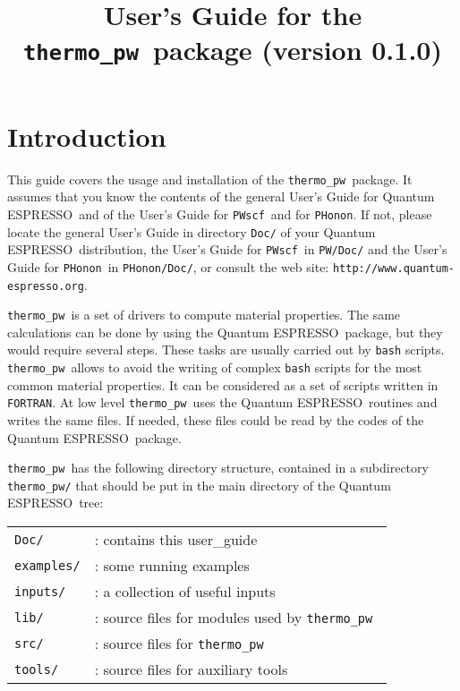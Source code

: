 \documentclass[12pt,a4paper]{article}
\def\version{0.1.0}
\def\qe{{\sc Quantum ESPRESSO}}
\def\PWscf{\texttt{PWscf}}
\def\PHonon{\texttt{PHonon}}
\def\thermo{\texttt{thermo\_pw}}
\begin{document}
 
\author{}
\date{}

\def\qeImage{../../Doc/quantum_espresso.pdf}
\def\democritosImage{../../Doc/democritos.pdf}
\def\SissaImage{./sissa.pdf}

\title{
  \vskip 1cm
  \Huge User's Guide for the \thermo\ package \smallskip
  \Large (version \version)
}

\maketitle

\tableofcontents

\section{Introduction}

This guide covers the usage and installation of the \thermo\ package. 
It assumes that you know the contents of the general User's Guide for \qe\ 
and of the User's Guide for \PWscf\ and for \PHonon. 
If not, please locate the general User's Guide in directory 
\texttt{Doc/} of your \qe\ distribution,
the User's Guide for \PWscf\ in \texttt{PW/Doc/} and the User's Guide
for \PHonon\ in \texttt{PHonon/Doc/}, or consult the web site:
\texttt{http://www.quantum-espresso.org}.

\thermo\ is a set of drivers to compute material properties. 
The same calculations can be done by using the \qe\ package, but they would 
require several steps. These tasks are usually carried out by \texttt{bash}
scripts. \thermo\ allows to avoid the writing of complex \texttt{bash}
scripts for the most common material properties. It can be considered as a set 
of scripts written in \texttt{FORTRAN}. At low level \thermo\ uses the \qe\ 
routines and writes the same files. If needed, these files could be read
by the codes of the \qe\ package. 

\thermo\ has the following directory structure, contained in a subdirectory 
\texttt{thermo\_pw/} that should be put in the main directory of the \qe\ tree:

\begin{tabular}{ll}
\texttt{Doc/}      & : contains this user\_guide \\
\texttt{examples/} & : some running examples \\
\texttt{inputs/}   & : a collection of useful inputs \\
\texttt{lib/}      & : source files for modules used by \thermo\ \\
\texttt{src/}      & : source files for \thermo\ \\
\texttt{tools/}    & : source files for auxiliary tools \\
\end{tabular}\\
\end{document}
